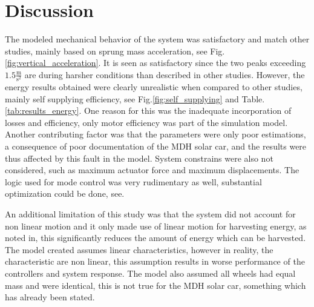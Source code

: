 \section{Discussion}
\label{section:discussion}

The modeled mechanical behavior of the system was satisfactory and match other studies, mainly based on sprung mass acceleration\:\cite{liuTransmissionEnergyharvestingStudy2021}, see Fig.\:\ref{fig:vertical_acceleration}. It is seen as satisfactory since the two peaks exceeding $1.5\frac{\text{m}}{\text{s}^2}$ are during harsher conditions than described in other studies\:\cite{liuTransmissionEnergyharvestingStudy2021}.
However, the energy results obtained were clearly unrealistic when compared to other studies, mainly self supplying efficiency\:\cite{azmiNovelOptimalControl2023}\cite{liuTransmissionEnergyharvestingStudy2021}\cite{liuModelingSimulationEnergyRegenerative2019}, see Fig.\:\ref{fig:self_supplying} and Table.\:\ref{tab:results_energy}.
One reason for this was the inadequate incorporation of losses and efficiency, only motor efficiency was part of the simulation model.
Another contributing factor was that the parameters were only poor estimations, a consequence of poor documentation of the MDH solar car, and the results were thus affected by this fault in the model.
System constrains were also not considered, such as maximum actuator force and maximum displacements.
The logic used for mode control was very rudimentary as well, substantial optimization could be done, see\:\cite{azmiNovelOptimalControl2023}.


An additional limitation of this study was that the system did not account for non linear motion and it only made use of linear motion for harvesting energy, as noted in\:\cite{azmiNovelOptimalControl2023}, this significantly reduces the amount of energy which can be harvested.
The model created assumes linear characteristics, however in reality, the characteristic are non linear, this assumption results in worse performance of the controllers and system response\:\cite{azmiNovelOptimalControl2023}. 
The model also assumed all wheels had equal mass and were identical, this is not true for the MDH solar car, something which has already been stated.

